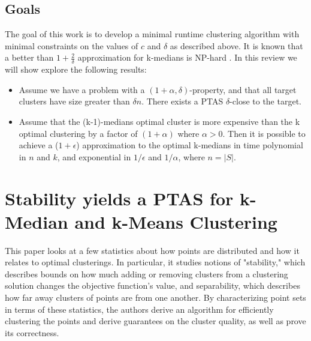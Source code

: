 \documentclass[paper=a4, fontsize=11pt]{scrartcl} %
\numberwithin{equation}{section} %
\numberwithin{figure}{section} %
\numberwithin{table}{section} %
\begin{document}
\subsection{Goals}

The goal of this work is to develop a minimal runtime clustering algorithm with minimal constraints on the values of $c$ and $\delta$ as described above. It is known that a better than $1 + \frac{2}{\delta}$ approximation for k-medians is NP-hard \cite{thethingthepapercitesJMS02}. In this review we will show explore the following results:

\begin{itemize}

\item Assume we have a problem with a $(1+\alpha, \delta)$-property, and that all target clusters have size greater than $\delta n$. There exists a PTAS $\delta$-close to the target.

\item Assume that the (k-1)-medians optimal cluster is more expensive than the k optimal clustering by a factor of $(1+\alpha)$ where $\alpha > 0$. Then it is possible to achieve a ($1+\epsilon$) approximation to the optimal k-medians in time polynomial in $n$ and $k$, and exponential in $1/\epsilon$ and $1/\alpha$, where $n = |S|$.

\end{itemize}


\section{Stability yields a PTAS for k-Median and k-Means Clustering}

This paper looks at a few statistics about how points are distributed and how it relates to optimal clusterings.  In particular, it studies notions of "stability," which describes bounds on how much adding or removing clusters from a clustering solution changes the objective function's value, and separability, which describes how far away clusters of points are from one another.  By characterizing point sets in terms of these statistics, the authors derive an algorithm for efficiently clustering the points and derive guarantees on the cluster quality, as well as prove its correctness.
\end{document}
